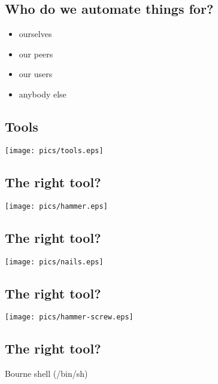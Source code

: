 \documentclass[xga]{xdvislides}
\begin{document}
\subsection{Who do we automate things for?}
\begin{itemize}
	\item ourselves
	\item our peers
	\item our users
	\item anybody else
\end{itemize}

\subsection{Tools}
\vspace*{\fill}
\begin{center}
	\texttt{[image: pics/tools.eps]}
\end{center}
\vspace*{\fill}

\subsection{The right tool?}
\vspace*{\fill}
\begin{center}
	\texttt{[image: pics/hammer.eps]}
\end{center}
\vspace*{\fill}

\subsection{The right tool?}
\vspace*{\fill}
\begin{center}
	\texttt{[image: pics/nails.eps]}
\end{center}
\vspace*{\fill}

\subsection{The right tool?}
\vspace*{\fill}
\begin{center}
	\texttt{[image: pics/hammer-screw.eps]}
\end{center}
\vspace*{\fill}

\subsection{The right tool?}
Bourne shell (/bin/sh) \\
\end{document}
